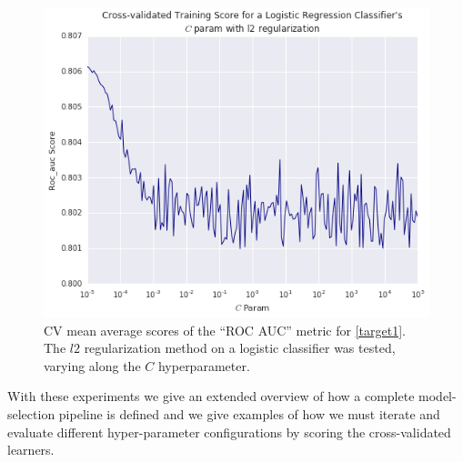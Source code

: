 \begin{figure}[h!]
	\begin{center}
		 \includegraphics[width=1\linewidth]{figures/cross_validation/logreg_cv_regularization_l2_rocauc_series}
		\caption{CV mean average scores of the ``ROC AUC'' metric for \cref{target1}.  The $l2$ regularization method on a logistic classifier was tested, varying along the $C$ hyperparameter.}
		\label{fig:rocauc_logreg_cv_l2_regularized_comparison}
	\end{center}
\end{figure}


With these experiments we give an extended overview of how a complete model-selection pipeline is defined and we give examples of how we must iterate and evaluate different hyper-parameter configurations by scoring the cross-validated learners.
